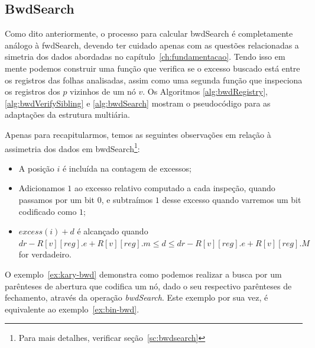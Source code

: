          
\subsection{BwdSearch}\label{sec:bwdSearch}
Como dito anteriormente, o processo para calcular bwdSearch é completamente análogo à fwdSearch, devendo ter cuidado apenas com as questões relacionadas a simetria dos dados abordadas no capítulo~\ref{ch:fundamentacao}. Tendo isso em mente podemos construir uma função que verifica se o excesso buscado está entre os registros das folhas analisadas, assim como uma segunda função que inspeciona os registros dos $p$ vizinhos de um nó $v$. Os Algoritmos \ref{alg:bwdRegistry}, \ref{alg:bwdVerifySibling} e \ref{alg:bwdSearch} mostram o pseudocódigo para as adaptações da estrutura multiária.

Apenas para recapitularmos, temos as seguintes observações em relação à assimetria dos dados em  bwdSearch\footnote{Para mais detalhes, verificar seção~\ref{sc:bwdsearch}}:
\begin{itemize}
    \item A posição $i$ é incluída na contagem de excessos;
    \item Adicionamos $1$ ao excesso relativo computado a cada inspeção, quando passamos por um bit $0$, e subtraímos $1$ desse excesso quando varremos um bit codificado como $1$;
    \item $excess(i) + d $ é alcançado quando $dr - R[v][reg].e + R[v][reg].m \leq d \leq dr - R[v][reg].e + R[v][reg].M $ for verdadeiro.
\end{itemize}

O exemplo~\ref{ex:kary-bwd}  demonstra como podemos realizar a busca por um parênteses de abertura que codifica um nó, dado o seu respectivo parênteses de fechamento, através da operação \textit{bwdSearch}. Este exemplo por sua vez, é equivalente ao exemplo~\ref{ex:bin-bwd}.

